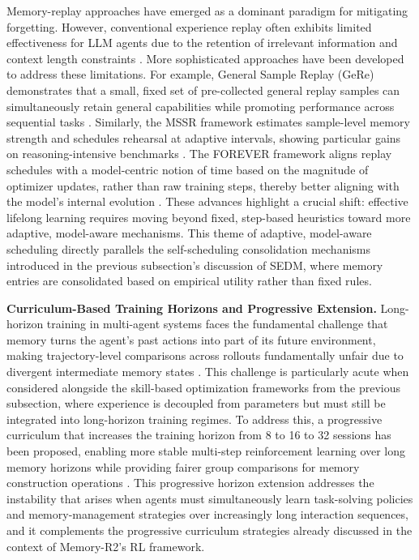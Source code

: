 \documentclass[11pt]{article}
\begin{document}
Memory-replay approaches have emerged as a dominant paradigm for mitigating forgetting. However, conventional experience replay often exhibits limited effectiveness for LLM agents due to the retention of irrelevant information and context length constraints \cite{ref171}. More sophisticated approaches have been developed to address these limitations. For example, General Sample Replay (GeRe) demonstrates that a small, fixed set of pre-collected general replay samples can simultaneously retain general capabilities while promoting performance across sequential tasks \cite{ref172}. Similarly, the MSSR framework estimates sample-level memory strength and schedules rehearsal at adaptive intervals, showing particular gains on reasoning-intensive benchmarks \cite{ref173}. The FOREVER framework aligns replay schedules with a model-centric notion of time based on the magnitude of optimizer updates, rather than raw training steps, thereby better aligning with the model's internal evolution \cite{ref174}. These advances highlight a crucial shift: effective lifelong learning requires moving beyond fixed, step-based heuristics toward more adaptive, model-aware mechanisms. This theme of adaptive, model-aware scheduling directly parallels the self-scheduling consolidation mechanisms introduced in the previous subsection's discussion of SEDM, where memory entries are consolidated based on empirical utility rather than fixed rules.

\textbf{Curriculum-Based Training Horizons and Progressive Extension.} Long-horizon training in multi-agent systems faces the fundamental challenge that memory turns the agent's past actions into part of its future environment, making trajectory-level comparisons across rollouts fundamentally unfair due to divergent intermediate memory states \cite{ref149}. This challenge is particularly acute when considered alongside the skill-based optimization frameworks from the previous subsection, where experience is decoupled from parameters but must still be integrated into long-horizon training regimes. To address this, a progressive curriculum that increases the training horizon from 8 to 16 to 32 sessions has been proposed, enabling more stable multi-step reinforcement learning over long memory horizons while providing fairer group comparisons for memory construction operations \cite{ref149}. This progressive horizon extension addresses the instability that arises when agents must simultaneously learn task-solving policies and memory-management strategies over increasingly long interaction sequences, and it complements the progressive curriculum strategies already discussed in the context of Memory-R2's RL framework.
\end{document}
